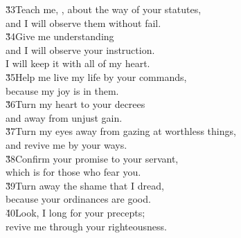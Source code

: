 \begin{poetry}
\poeml \v{33}Teach me, , about the way of your statutes, \\
\poemll    and I will observe them without fail. \\
\poeml \v{34}Give me understanding \\
\poemll    and I will observe your instruction. \\
\poemlll       I will keep it with all of my heart. \\
\poeml \v{35}Help me live my life by your commands, \\
\poemll    because my joy is in them. \\
\poeml \v{36}Turn my heart to your decrees \\
\poemll    and away from unjust gain. \\
\poeml \v{37}Turn my eyes away from gazing at worthless things, \\
\poemll    and revive me by your ways. \\
\poeml \v{38}Confirm your promise to your servant, \\
\poemll    which is for those who fear you. \\
\poeml \v{39}Turn away the shame that I dread, \\
\poemll    because your ordinances are good. \\
\poeml \v{40}Look, I long for your precepts; \\
\poemll    revive me through your righteousness.
\end{poetry}

